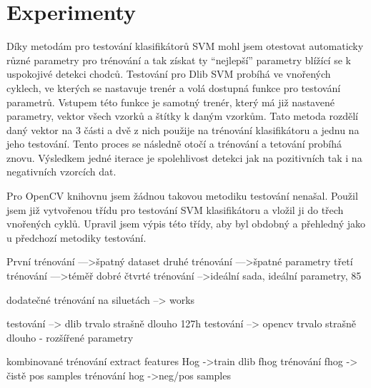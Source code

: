 \section{Experimenty}

Díky metodám pro testování klasifikátorů SVM mohl jsem otestovat automaticky různé parametry pro trénování a tak získat ty ``nejlepší'' parametry blížící se k uspokojivé detekci chodců. Testování pro Dlib SVM probíhá ve vnořených cyklech, ve kterých se nastavuje trenér a volá dostupná funkce pro testování parametrů. Vstupem této funkce je samotný trenér, který má již nastavené parametry, vektor všech vzorků a štítky k daným vzorkům. Tato metoda rozdělí daný vektor na 3 části a dvě z nich použije na trénování klasifikátoru a jednu na jeho testování. Tento proces se následně otočí a trénování a tetování probíhá znovu. Výsledkem jedné iterace je spolehlivost detekci jak na pozitivních tak i na negativních vzorcích dat. 

 Pro OpenCV knihovnu jsem žádnou takovou metodiku testování nenašal. Použil jsem již vytvořenou třídu pro testování SVM klasifikátoru a vložil ji do třech vnořených cyklů. Upravil jsem výpis této třídy, aby byl obdobný a přehledný jako u předchozí metodiky testování.  %

 První trénování --->špatný dataset
 druhé trénování --->špatné parametry
 třetí trénování --->téměř dobré
 čtvrté trénování -->ideální sada, ideální parametry, 85%
 
 dodatečné trénování na siluetách --> works


 testování --> dlib trvalo strašně dlouho 127h
 testování --> opencv trvalo strašně dlouho - rozšířené parametry


 kombinované trénování  extract features Hog  ->train dlib fhog
 trénování fhog -> čistě pos samples
 trénování hog ->neg/pos samples

